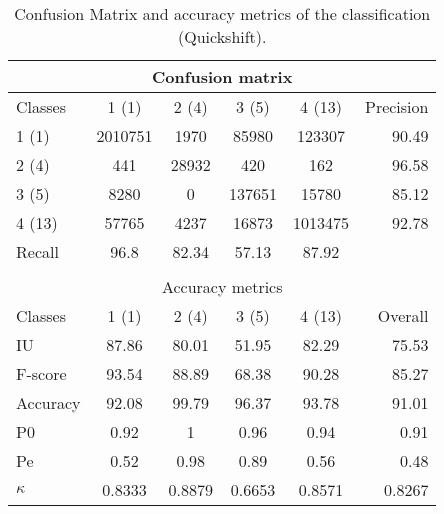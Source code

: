 \begin{table}[H]
\begin{center}
\footnotesize
\begin{tabular}{|l|c|c|c|c|r|}
\hline
\multicolumn{6}{|c|}{Confusion matrix} \\
\hline
 Classes & 1 (1) & 2 (4) & 3 (5) & 4 (13) & Precision \\
\hline
1 (1) & 2010751 & 1970 & 85980 & 123307 & 90.49 \\
\hline
2 (4) & 441 & 28932 & 420 & 162 & 96.58 \\
\hline
3 (5) & 8280 & 0 & 137651 & 15780 & 85.12 \\
\hline
4 (13) & 57765 & 4237 & 16873 & 1013475 & 92.78 \\
\hline
Recall & 96.8 & 82.34 & 57.13 & 87.92 &  \\
\hline
\multicolumn{6}{c}{ } \\
\hline
\multicolumn{6}{|c|}{Accuracy metrics} \\
\hline
 Classes & 1 (1) & 2 (4) & 3 (5) & 4 (13) & Overall \\
\hline
IU & 87.86 & 80.01 & 51.95 & 82.29 & 75.53 \\
\hline
F-score & 93.54 & 88.89 & 68.38 & 90.28 & 85.27 \\
\hline
Accuracy & 92.08 & 99.79 & 96.37 & 93.78 & 91.01 \\
\hline
P0 & 0.92 & 1 & 0.96 & 0.94 & 0.91 \\
\hline
Pe & 0.52 & 0.98 & 0.89 & 0.56 & 0.48 \\
\hline
$\kappa$ & 0.8333 & 0.8879 & 0.6653 & 0.8571 & 0.8267 \\
\hline
\end{tabular}
\caption{Confusion Matrix and accuracy metrics of the classification (Quickshift).}
\label{table:}
\end{center}
\end{table}
